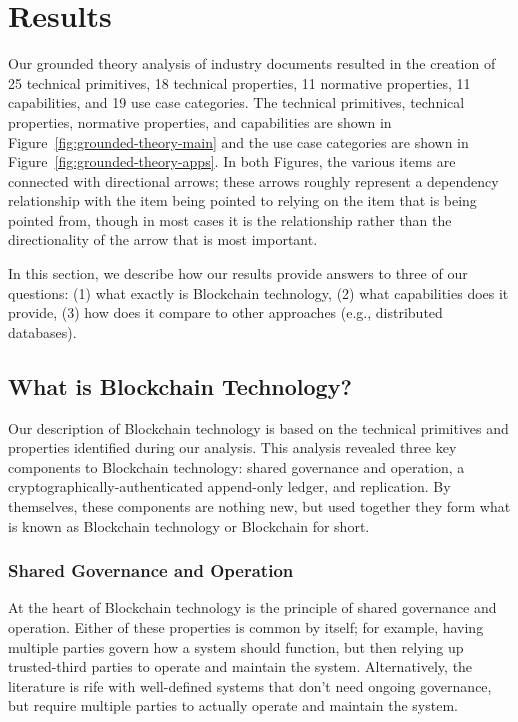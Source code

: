
\section{Results}

Our grounded theory analysis of industry documents resulted in the creation of 25 technical primitives, 18 technical properties, 11 normative properties, 11 capabilities, and 19 use case categories.
The technical primitives, technical properties, normative properties, and capabilities are shown in Figure~\ref{fig:grounded-theory-main} and the use case categories are shown in Figure~\ref{fig:grounded-theory-apps}.
In both Figures, the various items are connected with directional arrows; these arrows roughly represent a dependency relationship with the item being pointed to relying on the item that is being pointed from, though in most cases it is the relationship rather than the directionality of the arrow that is most important.

In this section, we describe how our results provide answers to three of our questions:  (1) what exactly is Blockchain technology, (2) what capabilities does it provide, (3) how does it compare to other approaches (e.g., distributed databases).

\subsection{What is Blockchain Technology?}
Our description of Blockchain technology is based on the technical primitives and properties identified during our analysis.
This analysis revealed three key components to Blockchain technology: shared governance and operation, a cryptographically-authenticated append-only ledger, and replication.
By themselves, these components are nothing new, but used together they form what is known as Blockchain technology or Blockchain for short.

\subsubsection{Shared Governance and Operation}
At the heart of Blockchain technology is the principle of shared governance and operation.
Either of these properties is common by itself; for example, having multiple parties govern how a system should function, but then relying up trusted-third parties to operate and maintain the system.
Alternatively, the literature is rife with well-defined systems that don't need ongoing governance, but require multiple parties to actually operate and maintain the system.

